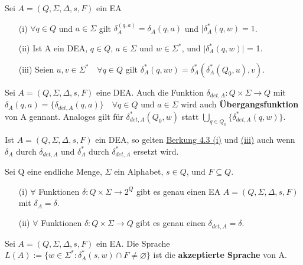 Sei \(A = (Q, \Sigma, \Delta, s, F)\) ein EA
\begin{itemize}
    \item [(i)] \( \forall q \in Q\) und \(a\in \Sigma\) gilt \(\delta_{A}^(q,a) = \delta_{A}(q, a)\) und \(|\delta^*_A(q,w) = 1\).
    \item [(ii)] Ist A ein DEA, \(q \in Q\), \(a \in \Sigma\) und \(w \in \Sigma^{*}\), und \(\lvert \delta_{A}^{*}(q,w) \rvert\) = 1.
    \item[(iii)] Seien \(u,v \in \Sigma^{*} \quad \forall q \in Q\) gilt \(\delta_{A}^{*}(q, uv) = \delta_{A}^{*}(\delta_{A}^{*}(Q_{0}, u), v)\).
\end{itemize}

Sei \(A = (Q, \Sigma,  \Delta, s, F)\) eine DEA. Auch die Funktion \(\delta_{det, A}: Q \times \Sigma \rightarrow Q\) mit \(\delta_{A}(q,a) = \{\delta_{det, A}(q, a)\} \quad \forall q \in Q\) und \(a \in \Sigma\) wird auch \textbf{Übergangsfunktion} von A gennant. Analoges gilt für \(\delta_{det, A}^{*}(Q_{0}, w)\) statt \(\bigcup \limits_{q \in Q_{0}}\{\delta_{det, A}^{*}(q, w)\}\).

    Ist \(A = (Q, \Sigma, \Delta, s, F)\) ein DEA, so gelten \hyperref[subsec:4.3]{Berkung 4.3 (i)} und \hyperref[subsec:4.3]{(iii)} auch wenn \(\delta_{A}\) durch \(\delta_{det, A}\) und \(\delta_{A}^{*}\) durch \(\delta_{det, A}^{*}\) ersetzt wird.

    Sei Q eine endliche Menge, \(\Sigma\) ein Alphabet, \(s\in Q\), und \(F\subseteq Q\). 
    \begin{itemize}
        \item [(i)] \(\forall\) Funktionen \(\delta : Q \times \Sigma \rightarrow 2^{Q}\) gibt es genau einen EA \(A = (Q, \Sigma, \Delta, s, F)\) mit \(\delta_{A} = \delta\).
        \item [(ii)] \(\forall\) Funktionen \(\delta : Q \times \Sigma \rightarrow Q\) gibt es genau einen \(\delta_{det, A} = \delta\). 
    \end{itemize}

    Sei \(A = (Q, \Sigma, \Delta, s, F)\) ein EA. Die Sprache \(L(A) := \{w \in \Sigma^{*} : \delta_{A}^{*}(s, w)\cap F \neq \varnothing \}\) ist die \textbf{akzeptierte Sprache} von A.

